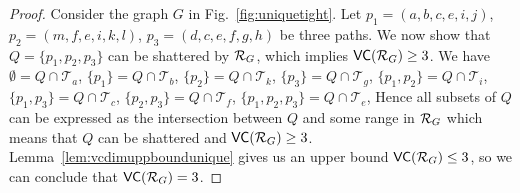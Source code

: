 \begin{proof}
  Consider the graph $G$ in Fig.~\ref{fig:uniquetight}.
  Let $p_1=(a,b,c,e,i,j)$, $p_2=(m,f,e,i,k,l)$, $p_3=(d,c,e,f,g,h)$ be three
  paths. We now show that $Q=\{p_1,p_2,p_3\}$ can be shattered by $\mathcal{R}_G$, which
  implies $\mathsf{VC}(\mathcal{R}_G)\ge 3$. We have $\emptyset=Q\cap\mathcal{T}_a$,
  $\{p_1\}=Q\cap\mathcal{T}_b$, $\{p_2\}=Q\cap\mathcal{T}_k$,
  $\{p_3\}=Q\cap\mathcal{T}_g$, $\{p_1,p_2\}=Q\cap\mathcal{T}_i$,
  $\{p_1,p_3\}=Q\cap\mathcal{T}_c$, $\{p_2,p_3\}=Q\cap\mathcal{T}_f$,
  $\{p_1,p_2,p_3\}=Q\cap\mathcal{T}_e$,  
  Hence all subsets of $Q$ can be expressed as the intersection between $Q$ and
  some range in $\mathcal{R}_G$ which means that $Q$ can be shattered and
  $\mathsf{VC}(\mathcal{R}_G)\ge 3$. Lemma~\ref{lem:vcdimuppboundunique} gives us an upper
  bound $\mathsf{VC}(\mathcal{R}_G)\le3$, so we can conclude that $\mathsf{VC}(\mathcal{R}_G)=3$.
\end{proof}
\fi

